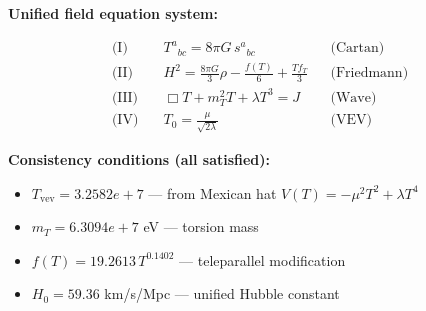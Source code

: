 
\textbf{Unified field equation system:}

\begin{align}
  \text{(I)} \quad & T^a{}_{bc} = 8\pi G \, s^a{}_{bc} && \text{(Cartan)} \\
  \text{(II)} \quad & H^2 = \frac{8\pi G}{3}\rho - \frac{f(T)}{6} + \frac{Tf_T}{3} && \text{(Friedmann)} \\
  \text{(III)} \quad & \Box T + m_T^2 T + \lambda T^3 = J && \text{(Wave)} \\
  \text{(IV)} \quad & T_0 = \frac{\mu}{\sqrt{2\lambda}} && \text{(VEV)}
\end{align}

\textbf{Consistency conditions (all satisfied):}
\begin{itemize}
  \item $T_{\text{vev}} = 3.2582e+7$ — from Mexican hat $V(T) = -\mu^2 T^2 + \lambda T^4$
  \item $m_T = 6.3094e+7$ eV — torsion mass
  \item $f(T) = 19.2613 \, T^{0.1402}$ — teleparallel modification
  \item $H_0 = 59.36$ km/s/Mpc — unified Hubble constant
\end{itemize}